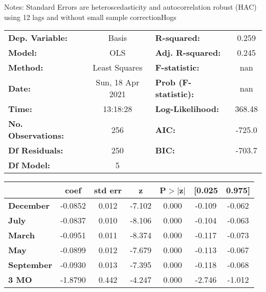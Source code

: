 Notes: \newline
 [1] Standard Errors are heteroscedasticity and autocorrelation robust (HAC) using 12 lags and without small sample correctionHogs\begin{center}
\begin{tabular}{lclc}
\toprule
\textbf{Dep. Variable:}    &      Basis       & \textbf{  R-squared:         } &     0.259   \\
\textbf{Model:}            &       OLS        & \textbf{  Adj. R-squared:    } &     0.245   \\
\textbf{Method:}           &  Least Squares   & \textbf{  F-statistic:       } &       nan   \\
\textbf{Date:}             & Sun, 18 Apr 2021 & \textbf{  Prob (F-statistic):} &      nan    \\
\textbf{Time:}             &     13:18:28     & \textbf{  Log-Likelihood:    } &    368.48   \\
\textbf{No. Observations:} &         256      & \textbf{  AIC:               } &    -725.0   \\
\textbf{Df Residuals:}     &         250      & \textbf{  BIC:               } &    -703.7   \\
\textbf{Df Model:}         &           5      & \textbf{                     } &             \\
\bottomrule
\end{tabular}
\begin{tabular}{lcccccc}
                   & \textbf{coef} & \textbf{std err} & \textbf{z} & \textbf{P$> |$z$|$} & \textbf{[0.025} & \textbf{0.975]}  \\
\midrule
\textbf{December}  &      -0.0852  &        0.012     &    -7.102  &         0.000        &       -0.109    &       -0.062     \\
\textbf{July}      &      -0.0837  &        0.010     &    -8.106  &         0.000        &       -0.104    &       -0.063     \\
\textbf{March}     &      -0.0951  &        0.011     &    -8.374  &         0.000        &       -0.117    &       -0.073     \\
\textbf{May}       &      -0.0899  &        0.012     &    -7.679  &         0.000        &       -0.113    &       -0.067     \\
\textbf{September} &      -0.0930  &        0.013     &    -7.395  &         0.000        &       -0.118    &       -0.068     \\
\textbf{3 MO}      &      -1.8790  &        0.442     &    -4.247  &         0.000        &       -2.746    &       -1.012     \\

\end{tabular}
\end{center}
